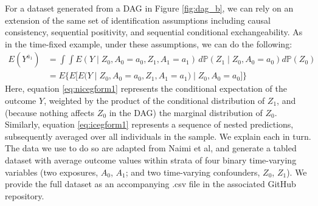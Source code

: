 \documentclass[12pt]{article}
\numberwithin{equation}{section}
\begin{document}
For a dataset generated from a DAG in Figure \ref{fig:dag_b}, we can rely on an extension of the same set of identification assumptions including causal consistency, sequential positivity, and sequential conditional exchangeability. As in the time-fixed example, under these assumptions, we can do the following:
\begin{align}
E(Y^{\overline{a}_1}) & = \int \int E(Y \mid Z_0, A_0 = a_0, Z_1, A_1 = a_1)\,d\mathbb{P}(Z_1\mid Z_0, A_0 = a_0)d\mathbb{P}(Z_0) \label{eq:nicegform1}\\
					  & = E \bigg \{ E \bigg [ E \big (Y \mid Z_0, A_0 = a_0, Z_1, A_1 = a_1 \big ) \mid Z_0, A_0 = a_0 \bigg ] \bigg \} \label{eq:icegform1}
\end{align}
Here, equation \ref{eq:nicegform1} represents the conditional expectation of the outcome $Y$, weighted by the product of the conditional distribution of $Z_1$, and (because nothing affects $Z_0$ in the DAG) the marginal distribution of $Z_0$. Similarly, equation \ref{eq:icegform1} represents a sequence of nested predictions, subsequently averaged over all individuals in the sample. We explain each in turn. The data we use to do so are adapted from Naimi et al,\cite{Naimi2017a} and generate a tabled dataset with average outcome values within strata of four binary time-varying variables (two exposures, $A_0$, $A_1$; and two time-varying confounders, $Z_0$, $Z_1$). We provide the full dataset as an accompanying .csv file in the associated GitHub repository. 
\end{document}
